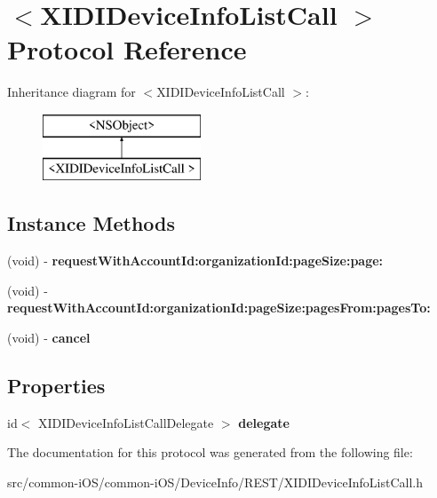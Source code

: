 \hypertarget{protocol_x_i_d_i_device_info_list_call_01-p}{}\section{$<$X\+I\+D\+I\+Device\+Info\+List\+Call $>$ Protocol Reference}
\label{protocol_x_i_d_i_device_info_list_call_01-p}
Inheritance diagram for $<$X\+I\+D\+I\+Device\+Info\+List\+Call $>$\+:\begin{figure}[H]
\begin{center}
\leavevmode
\includegraphics[height=2.000000cm]{protocol_x_i_d_i_device_info_list_call_01-p}
\end{center}
\end{figure}
\subsection*{Instance Methods}
\begin{DoxyCompactItemize}
\item 
\hypertarget{protocol_x_i_d_i_device_info_list_call_01-p_a2bb516b7fa63b929630fe42bff7fad5e}{}\label{protocol_x_i_d_i_device_info_list_call_01-p_a2bb516b7fa63b929630fe42bff7fad5e} 
(void) -\/ {\bfseries request\+With\+Account\+Id\+:organization\+Id\+:page\+Size\+:page\+:}
\item 
\hypertarget{protocol_x_i_d_i_device_info_list_call_01-p_aa1426b9e20881d5bce3fa86d8e544426}{}\label{protocol_x_i_d_i_device_info_list_call_01-p_aa1426b9e20881d5bce3fa86d8e544426} 
(void) -\/ {\bfseries request\+With\+Account\+Id\+:organization\+Id\+:page\+Size\+:pages\+From\+:pages\+To\+:}
\item 
\hypertarget{protocol_x_i_d_i_device_info_list_call_01-p_a54ea5d2bd583543db0a9984398e8bade}{}\label{protocol_x_i_d_i_device_info_list_call_01-p_a54ea5d2bd583543db0a9984398e8bade} 
(void) -\/ {\bfseries cancel}
\end{DoxyCompactItemize}
\subsection*{Properties}
\begin{DoxyCompactItemize}
\item 
\hypertarget{protocol_x_i_d_i_device_info_list_call_01-p_a76c59742d2b0bf9bd1fd1c8b939b8275}{}\label{protocol_x_i_d_i_device_info_list_call_01-p_a76c59742d2b0bf9bd1fd1c8b939b8275} 
id$<$ X\+I\+D\+I\+Device\+Info\+List\+Call\+Delegate $>$ {\bfseries delegate}
\end{DoxyCompactItemize}


The documentation for this protocol was generated from the following file\+:\begin{DoxyCompactItemize}
\item 
src/common-\/i\+O\+S/common-\/i\+O\+S/\+Device\+Info/\+R\+E\+S\+T/X\+I\+D\+I\+Device\+Info\+List\+Call.\+h\end{DoxyCompactItemize}
